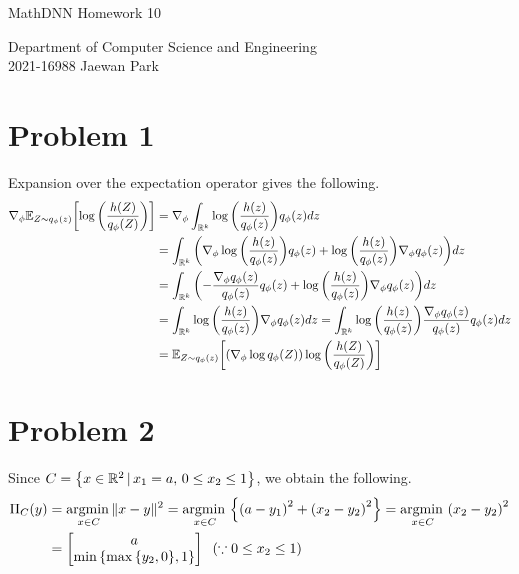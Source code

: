 \documentclass[10pt]{article}
\DeclareMathOperator*{\argmin}{argmin\,}
\begin{document}
\begin{center}
    {\LARGE MathDNN Homework 10} \\
\end{center}
\begin{flushright}
    Department of Computer Science and Engineering \\
    2021-16988 Jaewan Park
\end{flushright}

\section*{Problem 1}
Expansion over the expectation operator gives the following.
\begin{align*}
    \nabla_{\phi}\mathbb{E}_{Z \sim q_\phi(z)}\qty[\log\qty(\frac{h(Z)}{q_{\phi}(Z)})]
    &= \nabla_{\phi}\int_{\mathbb{R}^k}\log\qty(\frac{h(z)}{q_{\phi}(z)})q_\phi(z)dz \\
    &= \int_{\mathbb{R}^k}\qty(\nabla_{\phi}\log\qty(\frac{h(z)}{q_{\phi}(z)})q_\phi(z) + \log\qty(\frac{h(z)}{q_{\phi}(z)})\nabla_{\phi}q_\phi(z))dz \\
    &= \int_{\mathbb{R}^k}\qty(-\frac{\nabla_\phi q_\phi(z)}{q_\phi(z)}q_\phi(z) + \log\qty(\frac{h(z)}{q_{\phi}(z)})\nabla_{\phi}q_\phi(z))dz \\
    &= \int_{\mathbb{R}^k}\log\qty(\frac{h(z)}{q_{\phi}(z)})\nabla_{\phi}q_\phi(z)dz = \int_{\mathbb{R}^k}\log\qty(\frac{h(z)}{q_{\phi}(z)})\frac{\nabla_{\phi}q_\phi(z)}{q_\phi(z)}q_\phi(z)dz \\
    &= \mathbb{E}_{Z \sim q_\phi(z)}\qty[\qty(\nabla_\phi\log q_\phi(Z))\log\qty(\frac{h(Z)}{q_\phi(Z)})]
\end{align*}

\section*{Problem 2}
Since $C = \qty{x \in \mathbb{R}^2 \,|\, x_1 = a,\, 0 \leq x_2 \leq 1}$, we obtain the following.
\begin{align*}
    \Pi_C(y) &= \argmin_{x \in C}\lVert x-y \rVert^2 = \argmin_{x \in C}\qty{\qty(a - y_1)^2 + \qty(x_2 - y_2)^2} = \argmin_{x \in C}\qty(x_2 - y_2)^2 \\
    &= \begin{bmatrix}
        a \\ \min\qty{\max\qty{y_2, 0}, 1}
    \end{bmatrix} \;\; \qty(\because 0 \leq x _2 \leq 1)
\end{align*}
\end{document}
